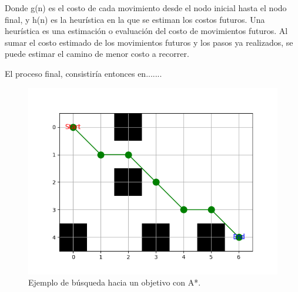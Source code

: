 Donde g(n) es el costo de cada movimiento desde el nodo inicial hasta el nodo final, y h(n) es la
heurística en la que se estiman los costos futuros. Una heurística es una estimación o evaluación del costo de
movimientos futuros. Al sumar el costo estimado de los movimientos futuros y los pasos ya realizados, se puede estimar el camino de menor costo a recorrer.


El proceso final, consistiría entonces en.......

\begin{figure}[H]
  \centering
  \includegraphics[scale=0.6]{figs/astar4} %
  \caption{ Ejemplo de búsqueda hacia un objetivo con A*.}
  \label{fig:mel}
\end{figure}

